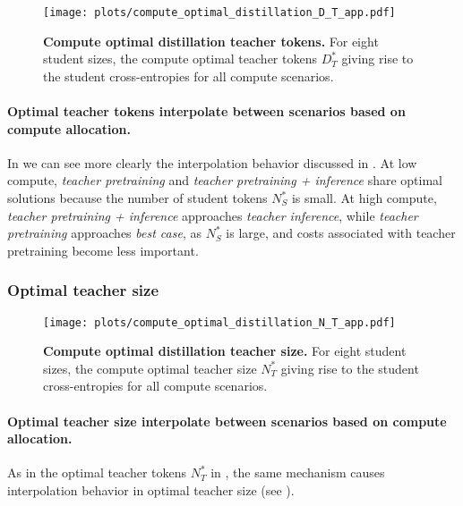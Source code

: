 \begin{figure}[h]
	\centering
        \vspace{-0.2cm}
	\texttt{[image: plots/compute\_optimal\_distillation\_D\_T\_app.pdf]}
        \vspace{-0.2cm}
	\caption{\textbf{Compute optimal distillation teacher tokens.} For eight student sizes, the compute optimal teacher tokens $D_T^*$ giving rise to the student cross-entropies for all compute scenarios.
	}
	\label{fig:compute-optimal-distillation-teacher-tokens-app}
        \vspace{-0.2cm}
\end{figure}

\paragraph{Optimal teacher tokens interpolate between scenarios based on compute allocation.}
In 
we can see more clearly the interpolation behavior discussed in 
.
At low compute, \emph{teacher pretraining} and \emph{teacher pretraining + inference}
share optimal solutions because the number of student tokens $N_S^*$ is small.
At high compute, 
\emph{teacher pretraining + inference} approaches \emph{teacher inference},
while 
\emph{teacher pretraining}
approaches \emph{best case},
as 
$N_S^*$ is large, and
costs associated with teacher pretraining become less important.

\FloatBarrier
\subsubsection{Optimal teacher size}
\label{sssec:teacher-size}

\begin{figure}[h]
	\centering
        \vspace{-0.2cm}
	\texttt{[image: plots/compute\_optimal\_distillation\_N\_T\_app.pdf]}
        \vspace{-0.2cm}
	\caption{\textbf{Compute optimal distillation teacher size.} For eight student sizes, the compute optimal teacher size $N_T^*$ giving rise to the student cross-entropies for all compute scenarios.
	}
        \vspace{-0.2cm}
	\label{fig:compute-optimal-distillation-teacher-size-app}
\end{figure}

\paragraph{Optimal teacher size interpolate between scenarios based on compute allocation.}
As in the optimal teacher tokens $N_T^*$ in ,
the same mechanism causes interpolation behavior in optimal teacher size (see ).

